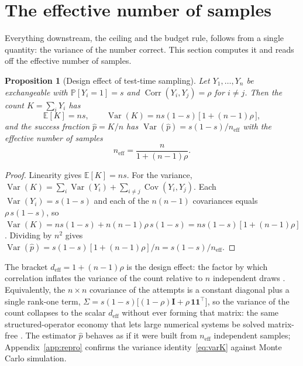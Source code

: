 \documentclass[11pt]{article}
\newtheorem{proposition}{Proposition}
\newcommand{\E}{\mathbb{E}}
\newcommand{\Prob}{\mathbb{P}}
\newcommand{\Var}{\operatorname{Var}}
\newcommand{\Cov}{\operatorname{Cov}}
\newcommand{\Corr}{\operatorname{Corr}}
\newcommand{\neff}{n_{\mathrm{eff}}}
\newcommand{\deff}{d_{\mathrm{eff}}}
\begin{document}
\section{The effective number of samples}
\label{sec:neff}

Everything downstream, the ceiling and the budget rule, follows from a single quantity: the variance of the number correct. This section computes it and reads off the effective number of samples.

\begin{proposition}[Design effect of test-time sampling]
\label{prop:deff}
Let $Y_1,\dots,Y_n$ be exchangeable with $\Prob[Y_i=1]=s$ and $\Corr(Y_i,Y_j)=\rho$ for $i\ne j$. Then the count $K=\sum_i Y_i$ has
\begin{equation}
\E[K] = ns,
\qquad
\Var(K) = ns(1-s)\,\big[\,1 + (n-1)\rho\,\big],
\label{eq:varK}
\end{equation}
and the success fraction $\hat p = K/n$ has $\Var(\hat p) = s(1-s)/\neff$ with the effective number of samples
\begin{equation}
\neff = \frac{n}{1 + (n-1)\rho}.
\label{eq:neff}
\end{equation}
\end{proposition}

\begin{proof}
Linearity gives $\E[K]=ns$. For the variance, $\Var(K) = \sum_i \Var(Y_i) + \sum_{i\ne j}\Cov(Y_i,Y_j)$. Each $\Var(Y_i)=s(1-s)$ and each of the $n(n-1)$ covariances equals $\rho\,s(1-s)$, so $\Var(K) = ns(1-s) + n(n-1)\rho\,s(1-s) = ns(1-s)[1+(n-1)\rho]$. Dividing by $n^2$ gives $\Var(\hat p) = s(1-s)[1+(n-1)\rho]/n = s(1-s)/\neff$.
\end{proof}

The bracket $\deff = 1+(n-1)\rho$ is the design effect: the factor by which correlation inflates the variance of the count relative to $n$ independent draws \citep{kish1965survey,cochran1977sampling}. Equivalently, the $n\times n$ covariance of the attempts is a constant diagonal plus a single rank-one term, $\Sigma = s(1-s)\big[(1-\rho)\mathbf{I} + \rho\,\mathbf{1}\mathbf{1}^\top\big]$, so the variance of the count collapses to the scalar $\deff$ without ever forming that matrix: the same structured-operator economy that lets large numerical systems be solved matrix-free \citep{bay2026no3d}. The estimator $\hat p$ behaves as if it were built from $\neff$ independent samples; Appendix~\ref{app:repro} confirms the variance identity~\eqref{eq:varK} against Monte Carlo simulation.
\end{document}
